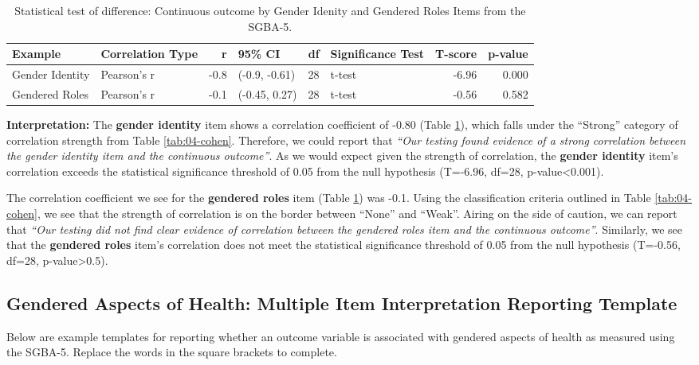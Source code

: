 \documentclass[
]{book}
\begin{document}
\begin{table}

\caption{\label{tab:04-2gah-tab-r}Statistical test of difference: Continuous outcome by Gender Idenity and Gendered Roles Items from the SGBA-5.}
\centering
\begin{tabular}[t]{llrlrlrr}
\toprule
Example & Correlation Type & r & 95\% CI & df & Significance Test & T-score & p-value\\
\midrule
Gender Identity & Pearson's r & -0.8 & (-0.9, -0.61) & 28 & t-test & -6.96 & 0.000\\
Gendered Roles & Pearson's r & -0.1 & (-0.45, 0.27) & 28 & t-test & -0.56 & 0.582\\
\bottomrule
\end{tabular}
\end{table}

\textbf{Interpretation:} The \textbf{gender identity} item shows a correlation coefficient of -0.80 (Table \ref{tab:04-2gah-tab-r}), which falls under the ``Strong'' category of correlation strength from Table \ref{tab:04-cohen}. Therefore, we could report that {\emph{``Our testing found evidence of a strong correlation between the gender identity item and the continuous outcome''}}. As we would expect given the strength of correlation, the \textbf{gender identity} item's correlation exceeds the statistical significance threshold of 0.05 from the null hypothesis (T=-6.96, df=28, p-value\textless0.001).

The correlation coefficient we see for the \textbf{gendered roles} item (Table \ref{tab:04-2gah-tab-r}) was -0.1. Using the classification criteria outlined in Table \ref{tab:04-cohen}, we see that the strength of correlation is on the border between ``None'' and ``Weak''. Airing on the side of caution, we can report that {\emph{``Our testing did not find clear evidence of correlation between the gendered roles item and the continuous outcome''}}. Similarly, we see that the \textbf{gendered roles} item's correlation does not meet the statistical significance threshold of 0.05 from the null hypothesis (T=-0.56, df=28, p-value\textgreater0.5).

\subsection{Gendered Aspects of Health: Multiple Item Interpretation Reporting Template}\label{gendered-aspects-of-health-multiple-item-interpretation-reporting-template}

Below are example templates for reporting whether an outcome variable is associated with gendered aspects of health as measured using the SGBA-5. Replace the words in the square brackets to complete.
\end{document}
